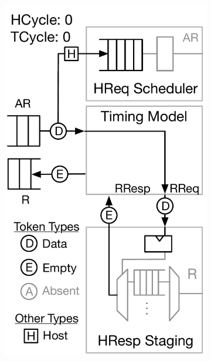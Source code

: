 \begin{figure}[t]
    \vspace{-0.25in}
	\centering
    \begin{subfigure}[t]{0.23\textwidth}
        \includegraphics[width=\columnwidth]{figures/model-operation-1.pdf}
        \caption{}
        \label{fig:model-operation-1}
    \end{subfigure}
    \begin{subfigure}[t]{0.24\textwidth}

\end{subfigure}
\end{figure}

